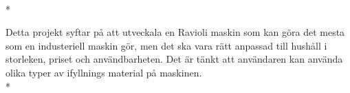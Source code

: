 \\*

Detta projekt syftar på att utveckala en Ravioli maskin som kan göra det mesta som en industeriell maskin gör, men det ska vara rätt anpassad till hushåll i storleken, priset och användbarheten. Det är tänkt att användaren kan använda olika typer av ifyllnings material på maskinen.\\*



